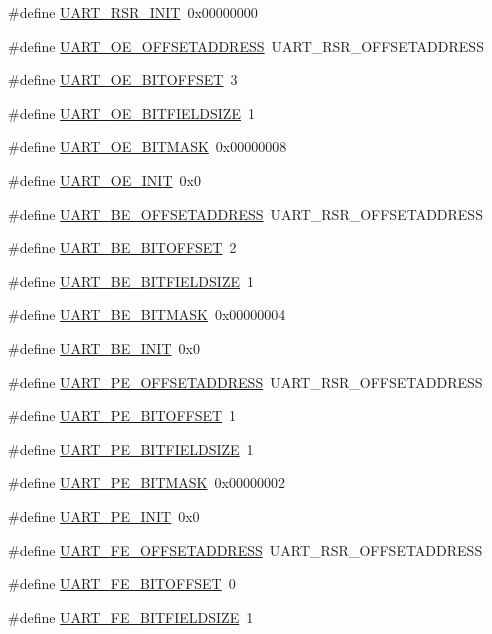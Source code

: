 \begin{DoxyCompactItemize}
\#define \hyperlink{a00575_acf45f450b1293ca140a7bc7b3972324c}{UART\_\-RSR\_\-INIT}~0x00000000
\item 
\#define \hyperlink{a00575_a1de9d021d17b31f871d2bcb618850f39}{UART\_\-OE\_\-OFFSETADDRESS}~UART\_\-RSR\_\-OFFSETADDRESS
\item 
\#define \hyperlink{a00575_a4a2f6cc4fe8c5ced6c62698f799ec8c7}{UART\_\-OE\_\-BITOFFSET}~3
\item 
\#define \hyperlink{a00575_ae186cec0dfb5f8ac65d2190a99b8492a}{UART\_\-OE\_\-BITFIELDSIZE}~1
\item 
\#define \hyperlink{a00575_a1d4c5db79b5c0724d82c1c1c81823ecc}{UART\_\-OE\_\-BITMASK}~0x00000008
\item 
\#define \hyperlink{a00575_abed3c421d4a8609fa1f9f70d3cc11917}{UART\_\-OE\_\-INIT}~0x0
\item 
\#define \hyperlink{a00575_ab675e449cf8031b09a53dfdb269aa3c8}{UART\_\-BE\_\-OFFSETADDRESS}~UART\_\-RSR\_\-OFFSETADDRESS
\item 
\#define \hyperlink{a00575_a372c9a75a36ae419506f2c039f87dd14}{UART\_\-BE\_\-BITOFFSET}~2
\item 
\#define \hyperlink{a00575_afd37bc62094270a5f356917ffac45c0d}{UART\_\-BE\_\-BITFIELDSIZE}~1
\item 
\#define \hyperlink{a00575_a8c55436bf75dc0e8eb1545abd50e0cc7}{UART\_\-BE\_\-BITMASK}~0x00000004
\item 
\#define \hyperlink{a00575_af99e315ebcb0fed24eaf47c02898499f}{UART\_\-BE\_\-INIT}~0x0
\item 
\#define \hyperlink{a00575_ac0a9340d05ea41ed6d564cde4f442859}{UART\_\-PE\_\-OFFSETADDRESS}~UART\_\-RSR\_\-OFFSETADDRESS
\item 
\#define \hyperlink{a00575_ad425d1d465e435f6c490132db3af8be2}{UART\_\-PE\_\-BITOFFSET}~1
\item 
\#define \hyperlink{a00575_ac71207aaafdfaaa4e6c8484c6320bda1}{UART\_\-PE\_\-BITFIELDSIZE}~1
\item 
\#define \hyperlink{a00575_ad6e3c7e74159b32c86705409f0acece3}{UART\_\-PE\_\-BITMASK}~0x00000002
\item 
\#define \hyperlink{a00575_adaf7a118b554387f6517b4c7eb777ac8}{UART\_\-PE\_\-INIT}~0x0
\item 
\#define \hyperlink{a00575_a84f997a66c8bfd5a0af7485ed8b99bf4}{UART\_\-FE\_\-OFFSETADDRESS}~UART\_\-RSR\_\-OFFSETADDRESS
\item 
\#define \hyperlink{a00575_a2d9fa70f2068427eb5f4168cd3254f68}{UART\_\-FE\_\-BITOFFSET}~0
\item 
\#define \hyperlink{a00575_a9f8df12876288fac20230fe809cf0425}{UART\_\-FE\_\-BITFIELDSIZE}~1

\end{DoxyCompactItemize}
